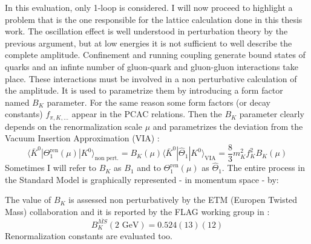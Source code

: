 \documentclass[english, LaM, oneside, noexaminfo]{sapthesis}
\newcommand{\la}{\langle}
\newcommand{\ra}{\rangle}
\newcommand{\gev}{\text{ GeV}}
\begin{document}
In this evaluation, only 1-loop is considered.
\newline
I will now proceed to highlight a problem that is the one responsible for the lattice calculation done in this thesis work.
The oscillation effect is well understood in perturbation theory by the previous argument, but at low energies it is not sufficient to well describe the complete amplitude.
Confinement and running coupling generate bound states of quarks and an infinte number of gluon-quark and gluon-gluon interactions take place.
These interactions must be involved in a non perturbative calculation of the amplitude.
It is used to parametrize them by introducing a form factor named $B_K$ parameter.
For the same reason some form factors (or decay constants) $f_{\pi,K,\dots}$ appear in the PCAC relations.
\newline
Then the $B_K$ parameter clearly depends on the renormalization scale $\mu$ and parametrizes the deviation from the Vacuum Insertion Approximation (VIA) \cite{BKetmcollaboration}:
\begin{equation}\label{eq:B_K-definition}
    \la \bar K^0 | \Theta_1^\text{ren} (\mu) | K^0 \ra_\text{non pert.} = B_K(\mu) \la \bar K^0 | \hat\Theta_1 | K^0 \ra_\text{VIA} = \frac{8}{3} m_K^2 f_K^2 B_K(\mu)
\end{equation}
Sometimes I will refer to $B_K$ as $B_1$ and to $\Theta_1^\text{ren} (\mu)$ as $\hat\Theta_1$.
The entire process in the Standard Model is graphically represented - in momentum space - by:
\begin{figure}[!h]
    \centering
\end{figure}
\newline
The value of $B_K$ is assessed non perturbatively by the ETM (Europen Twisted Mass) collaboration and it is reported by the FLAG working group in \cite{FLAG}\cite{ParticleDataGroup}:
\begin{equation}\label{B_K-value}
    B_K^{\overline{MS}}(2 \gev) = 0.524(13)(12)    
\end{equation}
Renormalization constants are evaluated too.
\end{document}
